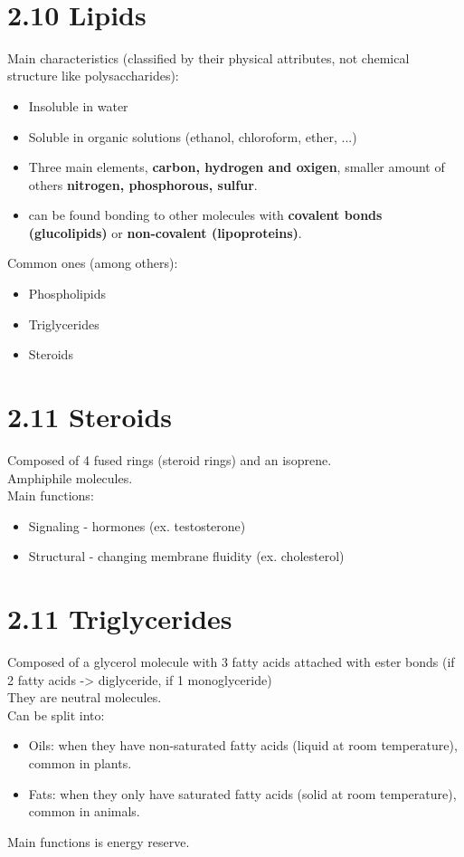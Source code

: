 \documentclass[a4paper,landscape,10pt]{cheatsheet}
\begin{document}
\hfill\\
\section*{2.10 Lipids}
Main characteristics (classified by their physical attributes, not chemical structure like polysaccharides):
\begin{itemize}
  \item Insoluble in water
  \item Soluble in organic solutions (ethanol, chloroform, ether, ...)
  \item Three main elements, \textbf{carbon, hydrogen and oxigen}, smaller amount of others \textbf{nitrogen,
          phosphorous, sulfur}.
  \item can be found bonding to other molecules with \textbf{covalent bonds (glucolipids)} or \textbf{non-covalent (lipoproteins)}.
\end{itemize}

Common ones (among others):
\begin{itemize}
  \item Phospholipids
  \item Triglycerides
  \item Steroids
\end{itemize}

\section*{2.11 Steroids}
Composed of 4 fused rings (steroid rings) and an isoprene. \\
Amphiphile  molecules.\\
Main functions:
\begin{itemize}
  \item Signaling - hormones (ex. testosterone)
  \item Structural - changing membrane fluidity (ex. cholesterol)
\end{itemize}

\section*{2.11 Triglycerides}
Composed of a glycerol molecule with 3 fatty acids attached with ester bonds (if 2 fatty acids -> diglyceride, if 1 monoglyceride)\\
They are neutral  molecules.\\
Can be split into:
\begin{itemize}
  \item Oils: when they have non-saturated fatty acids (liquid at room temperature), common in plants.
  \item Fats: when they only have saturated fatty acids (solid at room temperature), common in animals.
\end{itemize}
Main functions is energy reserve.
\end{document}
